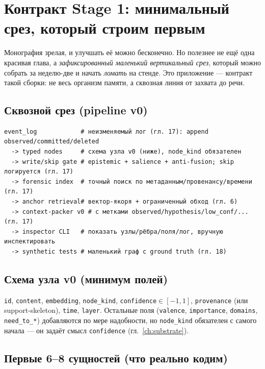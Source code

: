 \chapter{Контракт Stage 1: минимальный срез, который строим первым}
\label{ch:stage1}

Монография зрелая, и улучшать её можно бесконечно. Но полезнее не ещё одна красивая
глава, а \emph{зафиксированный маленький вертикальный срез}, который можно собрать за
неделю-две и начать \emph{ломать} на стенде. Это приложение — контракт такой сборки:
не весь организм памяти, а сквозная линия от захвата до речи.

\section{Сквозной срез (pipeline v0)}

\begin{lstlisting}[style=pseudo]
event_log            # неизменяемый лог (гл. 17): append observed/committed/deleted
  -> typed nodes     # схема узла v0 (ниже), node_kind обязателен
  -> write/skip gate # epistemic + salience + anti-fusion; skip логируется (гл. 17)
  -> forensic index  # точный поиск по метаданным/провенансу/времени (гл. 17)
  -> anchor retrieval# вектор-якоря + ограниченный обход (гл. 6)
  -> context-packer v0 # с метками observed/hypothesis/low_conf/... (гл. 17)
  -> inspector CLI   # показать узлы/рёбра/поля/лог, вручную инспектировать
  -> synthetic tests # маленький граф с ground truth (гл. 18)
\end{lstlisting}

\section{Схема узла v0 (минимум полей)}

\texttt{id}, \texttt{content}, \texttt{embedding}, \texttt{node\_kind},
\texttt{confidence}$\in[-1,1]$, \texttt{provenance} (или support-skeleton),
\texttt{time}, \texttt{layer}. Остальные поля (\texttt{valence},
\texttt{importance}, \texttt{domains}, \texttt{need\_to\_*}) добавляются по мере
надобности, но \texttt{node\_kind} обязателен с самого начала — он задаёт смысл
\texttt{confidence} (гл.~\ref{ch:substrate}).

\section{Первые 6--8 сущностей (что реально кодим)}

